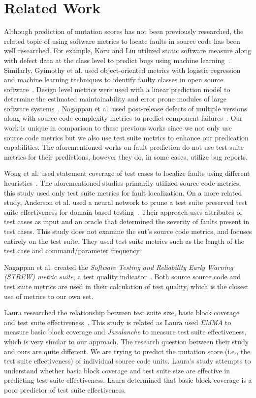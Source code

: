 \section{Related Work}
\label{sec:approach_related_work}
Although prediction of mutation scores has not been previously researched, the related topic of using software metrics to locate faults in source code has been well researched. For example, Koru and Liu utilized static software measure along with defect data at the class level to predict bugs using machine learning~\cite{KL05}. Similarly, Gyimothy et al. used object-oriented metrics with logistic regression and machine learning techniques to identify faulty classes in open source software~\cite{GFS05}. Design level metrics were used with a linear prediction model to determine the estimated maintainability and error prone modules of large software systems~\cite{MKPS00}. Nagappan et al. used post-release defects of multiple versions along with source code complexity metrics to predict component failures~\cite{NBZ06}. Our work is unique in comparison to these previous works since we not only use source code metrics but we also use test suite metrics to enhance our predication capabilities. The aforementioned works on fault prediction do not use test suite metrics for their predictions, however they do, in some cases, utilize bug reports.

Wong et al. used statement coverage of test cases to localize faults using different heuristics~\cite{WDC10}. The aforementioned studies primarily utilized source code metrics, this study used only test suite metrics for fault localization. On a more related study, Anderson et al. used a neural network to prune a test suite preserved test suite effectiveness for domain based testing~\cite{AMM95}. Their approach uses attributes of test cases as input and an oracle that determined the severity of faults present in test cases. This study does not examine the \gls{sut}'s source code metrics, and focuses entirely on the test suite. They used test suite metrics such as the length of the test case and command/parameter frequency.

Nagappan et al. created the \emph{Software Testing and Reliability Early Warning (STREW) metric suite}, a test quality indicator~\cite{NWO+05, NWVO05}. Both source source code and test suite metrics are used in their calculation of test quality, which is the closest use of metrics to our own set.

Laura researched the relationship between test suite size, basic block coverage and test suite effectiveness~\cite{Ino12}. This study is related as Laura used \emph{EMMA} to measure basic block coverage and \emph{Javalanche} to measure test suite effectiveness, which is very similar to our approach. The research question between their study and ours are quite different. We are trying to predict the mutation score (i.e., the test suite effectiveness) of individual source code units. Laura's study attempts to understand whether basic block coverage and test suite size are effective in predicting test suite effectiveness. Laura determined that basic block coverage is a poor predictor of test suite effectiveness. 


